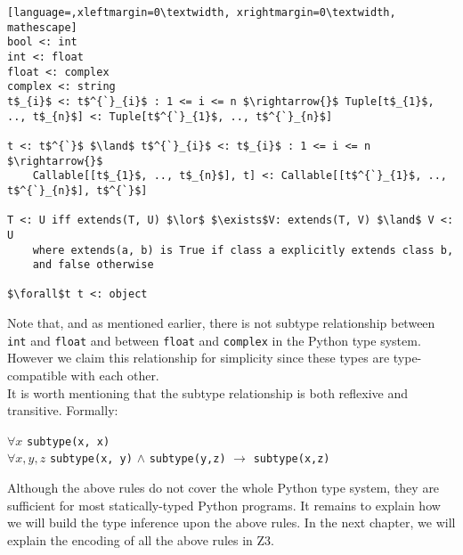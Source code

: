 \begin{lstlisting}[language=,xleftmargin=0\textwidth, xrightmargin=0\textwidth, mathescape]
bool <: int
int <: float
float <: complex
complex <: string
t$_{i}$ <: t$^{`}_{i}$ : 1 <= i <= n $\rightarrow{}$ Tuple[t$_{1}$, .., t$_{n}$] <: Tuple[t$^{`}_{1}$, .., t$^{`}_{n}$]

t <: t$^{`}$ $\land$ t$^{`}_{i}$ <: t$_{i}$ : 1 <= i <= n $\rightarrow{}$
	Callable[[t$_{1}$, .., t$_{n}$], t] <: Callable[[t$^{`}_{1}$, .., t$^{`}_{n}$], t$^{`}$]
	
T <: U iff extends(T, U) $\lor$ $\exists$V: extends(T, V) $\land$ V <: U 
	where extends(a, b) is True if class a explicitly extends class b,
	and false otherwise
	
$\forall$t t <: object
\end{lstlisting}

Note that, and as mentioned earlier, there is not subtype relationship between \lstinline|int| and \lstinline|float| and between \lstinline|float| and \lstinline|complex| in the Python type system. However we claim this relationship for simplicity since these types are type-compatible with each other.\\

It is worth mentioning that the subtype relationship is both reflexive and transitive. Formally:


\begin{center}
	$\forall x$ \lstinline|subtype(x, x)| \\
	$\forall x,y,z$ \lstinline|subtype(x, y)| $\land$ \lstinline|subtype(y,z)| $\rightarrow$ \lstinline|subtype(x,z)|
\end{center}

Although the above rules do not cover the whole Python type system, they are sufficient for most statically-typed Python programs. It remains to explain how we will build the type inference upon the above rules. In the next chapter, we will explain the encoding of all the above rules in Z3.
